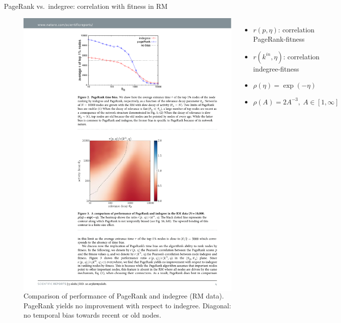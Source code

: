 \begin{frame}{PageRank vs.\ indegree: correlation with fitness in RM}
    \begin{figure}
        \begin{columns}

            \includegraphics[width=1.0\textwidth]{figures/PageRankRM_heatmap}


            \begin{footnotesize}
                \begin{itemize}
                    \item $r(p, \eta)$: correlation PageRank-fitness
                    \item $r(k^{in}, \eta)$: correlation indegree-fitness
                \end{itemize}
            \begin{itemize}
                \item $\rho(\eta) = \exp(-\eta)$
                \item $\rho(A) = 2A^{-3}, \; A \in [1, \infty]$
            \end{itemize}
        \end{footnotesize}
        \end{columns}

    \caption{Comparison of performance of PageRank and indegree (RM data). \newline
    PageRank yields no improvement with respect to indegree. \newline
    Diagonal: no temporal bias towards recent or old nodes.}
\end{figure}
\end{frame}
